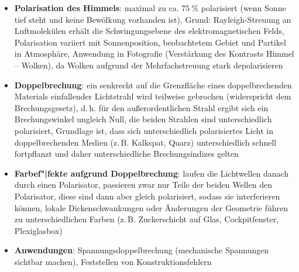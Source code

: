\linie
\begin{itemize}
    \item
    \textbf{Polarisation des Himmels}:
    maximal zu ca. $\SI{75}{\percent}$ polarisiert
    (wenn Sonne tief steht und keine Bewölkung vorhanden ist),
    Grund: Rayleigh-Streuung an Luftmolekülen erhält die Schwingungsebene
    des elektromagnetischen Felds,
    Polarisation variiert mit Sonnenposition, beobachtetem Gebiet und
    Partikel in Atmosphäre,
    Anwendung in Fotografie (Verstärkung des Kontrasts Himmel -- Wolken),
    da Wolken aufgrund der Mehrfachstreuung stark depolarisieren
\end{itemize}
\linie
\pagebreak
\begin{itemize}
    \item
    \textbf{Doppelbrechung}:
    ein senkrecht auf die Grenzfläche eines doppelbrechenden Materials
    einfallender Lichtstrahl wird teilweise gebrochen (widerspricht dem
    Brechungsgesetz), d.\,h. für den außerordentlichen Strahl ergibt sich
    ein Brechungswinkel ungleich Null, die beiden Strahlen sind unterschiedlich
    polarisiert,
    Grundlage ist, dass sich unterschiedlich polarisiertes Licht in
    doppelbrechenden Medien (z.\,B. Kalkspat, Quarz) unterschiedlich schnell
    fortpflanzt und daher unterschiedliche Brechungsindizes gelten

    \item
    \textbf{Farbef"|fekte aufgrund Doppelbrechung}:
    laufen die Lichtwellen danach durch einen Polarisator, passieren zwar nur
    Teile der beiden Wellen den Polarisator, diese sind dann aber gleich
    polarisiert, sodass sie interferieren können,
    lokale Dickenschwankungen oder Änderungen der Geometrie führen zu
    unterschiedlichen Farben
    (z.\,B. Zuckerschicht auf Glas, Cockpitfenster, Plexiglasbox)

    \item
    \textbf{Anwendungen}:
    Spannungsdoppelbrechung (mechanische Spannungen sichtbar machen),
    Feststellen von Konstruktionsfehlern
\end{itemize}
\linie
